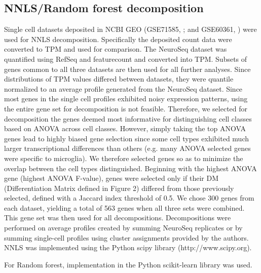 \subsection{NNLS/Random forest decomposition}
Single cell datasets deposited in NCBI GEO (GSE71585, \cite{Tasic_2016}; and GSE60361, \cite{Zeisel_2015}) were used for NNLS decomposition. Specifically the deposited count data were converted to TPM and used for comparison. The NeuroSeq dataset was quantified using RefSeq and featurecount \citep{Liao_2013} and converted into TPM. Subsets of genes common to all three datasets are then used for all further analyses. Since distributions of TPM values  differed between datasets, they were quantile normalized to an average profile generated from the NeuroSeq dataset. Since most genes in the single cell profiles exhibited noisy expression patterns, using the entire gene set for decomposition is not feasible. Therefore, we selected for decomposition the genes deemed most informative for distinguishing cell classes based on ANOVA across cell classes. However, simply taking the top ANOVA genes lead to highly biased gene selection since some cell types exhibited much larger transcriptional differences than others (e.g. many ANOVA selected genes were specific to microglia). We therefore selected genes so as to minimize the overlap between the cell types distinguished. Beginning with the highest ANOVA gene (highest ANOVA F-value), genes were selected only if their DM (Differentiation Matrix defined in Figure 2) differed from those previously selected, defined with a Jaccard index threshold  of 0.5. We chose 300 genes from each dataset, yielding a total of 563 genes when all three sets were combined. This gene set was then used for all decompositions. Decompositions were performed on average profiles created by summing NeuroSeq replicates or by summing single-cell profiles using cluster assignments provided by the authors. NNLS was implemented using the Python scipy library (http://www.scipy.org). 

For Random forest, implementation in the Python scikit-learn library \citep{scikit-learn} was used. 

